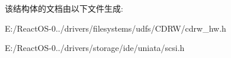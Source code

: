 \begin{DoxyCompactItemize}
\begin{tabbing}
\end{tabbing}\end{DoxyCompactItemize}


该结构体的文档由以下文件生成\+:\begin{DoxyCompactItemize}
\item 
E\+:/\+React\+O\+S-\/0../drivers/filesystems/udfs/\+C\+D\+R\+W/cdrw\+\_\+hw.\+h\item 
E\+:/\+React\+O\+S-\/0../drivers/storage/ide/uniata/scsi.\+h\end{DoxyCompactItemize}
